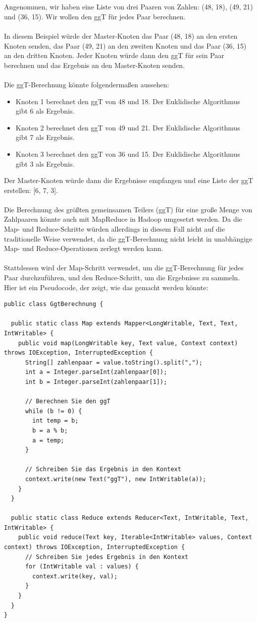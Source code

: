 \\\\
Angenommen, wir haben eine Liste von drei Paaren von Zahlen: (48, 18), (49, 21) und (36, 15). Wir wollen den ggT für jedes Paar berechnen.
\\\\
In diesem Beispiel würde der Master-Knoten das Paar (48, 18) an den ersten Knoten senden, das Paar (49, 21) an den zweiten Knoten und das Paar (36, 15) an den dritten Knoten. Jeder Knoten würde dann den ggT für sein Paar berechnen und das Ergebnis an den Master-Knoten senden.
\\\\
Die ggT-Berechnung könnte folgendermaßen aussehen:
\begin{itemize}
\item Knoten 1 berechnet den ggT von 48 und 18. Der Euklidische Algorithmus gibt 6 als Ergebnis.
\item Knoten 2 berechnet den ggT von 49 und 21. Der Euklidische Algorithmus gibt 7 als Ergebnis.
\item Knoten 3 berechnet den ggT von 36 und 15. Der Euklidische Algorithmus gibt 3 als Ergebnis.
\end{itemize}
Der Master-Knoten würde dann die Ergebnisse empfangen und eine Liste der ggT erstellen: [6, 7, 3].
\\\\
Die Berechnung des größten gemeinsamen Teilers (ggT) für eine große Menge von Zahlpaaren könnte auch mit MapReduce in Hadoop umgesetzt werden. Da die Map- und Reduce-Schritte würden allerdings in diesem Fall nicht auf die traditionelle Weise verwendet, da die ggT-Berechnung nicht leicht in unabhängige Map- und Reduce-Operationen zerlegt werden kann.
\\\\
Stattdessen wird der Map-Schritt verwendet, um die ggT-Berechnung für jedes Paar durchzuführen, und den Reduce-Schritt, um die Ergebnisse zu sammeln. Hier ist ein Pseudocode, der zeigt, wie das gemacht werden könnte:
\begin{lstlisting}[caption={Map- und Reduce},captionpos=b,label={lst:map_e}]
public class GgtBerechnung {

  public static class Map extends Mapper<LongWritable, Text, Text, IntWritable> {
    public void map(LongWritable key, Text value, Context context) throws IOException, InterruptedException {
      String[] zahlenpaar = value.toString().split(",");
      int a = Integer.parseInt(zahlenpaar[0]);
      int b = Integer.parseInt(zahlenpaar[1]);
      
      // Berechnen Sie den ggT
      while (b != 0) {
        int temp = b;
        b = a % b;
        a = temp;
      }
      
      // Schreiben Sie das Ergebnis in den Kontext
      context.write(new Text("ggT"), new IntWritable(a));
    }
  }

  public static class Reduce extends Reducer<Text, IntWritable, Text, IntWritable> {
    public void reduce(Text key, Iterable<IntWritable> values, Context context) throws IOException, InterruptedException {
      // Schreiben Sie jedes Ergebnis in den Kontext
      for (IntWritable val : values) {
        context.write(key, val);
      }
    }
  }
}
\end{lstlisting}
